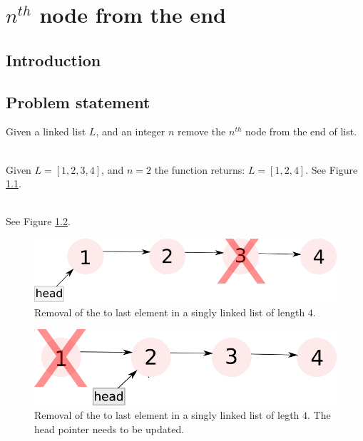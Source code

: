 %

\chapter{$n^{th}$ node from the end}
\label{ch:node_from_the_end}
\section*{Introduction}

\section{Problem statement}
\begin{exercise}
Given a linked list $L$, and an integer $n$ remove the $n^{th}$ node from the end of list.


\begin{example}
	\hfill \\
	Given $L=[1,2,3,4]$, and $n=2$ the function returns: $L=[1,2,4]$. See Figure \ref{fig:node_from_the_end:example1}.
\end{example}

\begin{example}
	\hfill \\
	 See Figure \ref{fig:node_from_the_end:example2}.
\end{example}
\end{exercise}


\begin{figure}
	\label{fig:node_from_the_end:example1}
	\centering
	\includegraphics[scale=1.0]{sources/node_from_the_end/images/example1}
	\caption{Removal of the  to last element in a singly linked list of length $4$.}
\end{figure}

\begin{figure}
	\label{fig:node_from_the_end:example2}
	\centering
	\includegraphics[scale=1.0]{sources/node_from_the_end/images/example2}
	\caption{Removal of the  to last element in a singly linked list of legth $4$. The head pointer needs to be updated.}
\end{figure}



